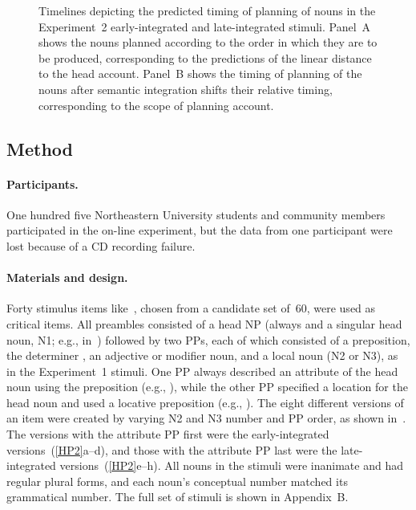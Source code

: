 \documentclass[12pt,titlepage]{article}
\newcommand{\framefig}[1]{#1}
\begin{document}
\begin{figure}[tb]

    \makebox[\textwidth][c]{\framefig{\texttt{[image: timeline]}}}

    \caption{Timelines depicting the predicted timing of planning of nouns
    in the Experiment~2 early-integrated and late-integrated stimuli.
    Panel~A shows the nouns planned according to the order in which they
    are to be produced, corresponding to the predictions of the linear
    distance to the head account.  Panel~B shows the timing of planning of
    the nouns after semantic integration shifts their relative timing,
    corresponding to the scope of planning account.}

\label{timeline}
\end{figure}

\subsection{Method}

\paragraph{Participants.} One hundred five Northeastern University
students and community members participated in the on-line experiment, but
the data from one participant were lost because of a CD recording failure.

\paragraph{Materials and design.} Forty stimulus items
like~, chosen from a candidate set of~60, were used as
critical items.  All preambles consisted of a head NP (always
 and a singular head noun, N1; e.g., 
in~) followed by two PPs, each of which consisted of a
preposition, the determiner , an adjective or modifier noun,
and a local noun (N2 or N3), as in the Experiment~1 stimuli.  One PP
always described an attribute of the head noun using the preposition
 (e.g., ), while the other PP
specified a location for the head noun and used a locative preposition
(e.g., ).  The eight different versions of an item
were created by varying N2 and N3 number and PP order, as shown
in~.  The versions with the attribute PP first were the
early-integrated versions~(\ref{HP2}a--d), and those with the
attribute PP last were the late-integrated versions~(\ref{HP2}e--h).
All nouns in the stimuli were inanimate and had regular plural forms,
and each noun's conceptual number matched its grammatical number.  The
full set of stimuli is shown in Appendix~B.
\end{document}
